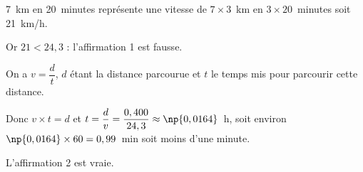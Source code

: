 
\medskip

%
%
%
%
%
%
%
%
7~km en 20~minutes représente une vitesse de $7 \times 3$~km en $3 \times 20$~minutes soit 21~km/h.

Or $21 < 24,3$ : l'affirmation 1 est fausse.

On a $ v = \dfrac{d}{t}$, $d$ étant la distance parcourue et $t$ le temps mis pour parcourir cette distance.

Donc $v \times t = d$ et $t = \dfrac{d}{v} = \dfrac{0,400}{24,3} \approx \np{0,0164}$~h, soit environ $\np{0,0164} \times 60 = 0,99$~min soit moins d'une minute.

L'affirmation 2 est vraie.
